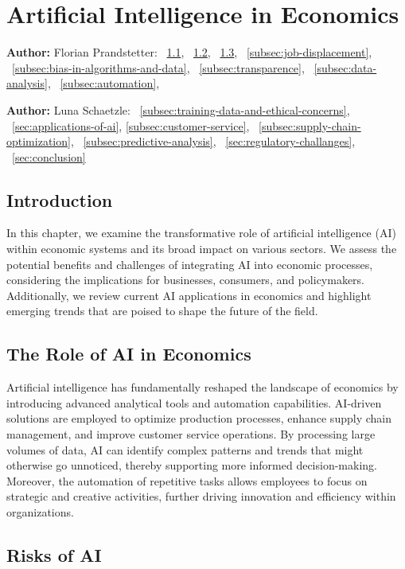 \chapter{Artificial Intelligence in Economics}
\label{chap:Artificial_Intelligence_in_Economics}
\textbf{Author:} Florian Prandstetter: ~\ref{sec:introduction}, ~\ref{sec:role-of-ai-in-economics}, ~\ref{sec:risks-of-ai}, ~\ref{subsec:job-displacement}, ~\ref{subsec:bias-in-algorithms-and-data}, ~\ref{subsec:transparence}, ~\ref{subsec:data-analysis}, ~\ref{subsec:automation}, 

\textbf{Author:} Luna Schaetzle: ~\ref{subsec:training-data-and-ethical-concerns}, ~\ref{sec:applications-of-ai}, \ref{subsec:customer-service}, ~\ref{subsec:supply-chain-optimization}, ~\ref{subsec:predictive-analysis}, ~\ref{sec:regulatory-challanges}, ~\ref{sec:conclusion}


\section{Introduction}
\label{sec:introduction}

In this chapter, we examine the transformative role of artificial intelligence (AI) within economic systems and its broad impact on various sectors. We assess the potential benefits and challenges of integrating AI into economic processes, considering the implications for businesses, consumers, and policymakers. Additionally, we review current AI applications in economics and highlight emerging trends that are poised to shape the future of the field.

\section{The Role of AI in Economics}
\label{sec:role-of-ai-in-economics}

Artificial intelligence has fundamentally reshaped the landscape of economics by introducing advanced analytical tools and automation capabilities. AI-driven solutions are employed to optimize production processes, enhance supply chain management, and improve customer service operations. By processing large volumes of data, AI can identify complex patterns and trends that might otherwise go unnoticed, thereby supporting more informed decision-making. Moreover, the automation of repetitive tasks allows employees to focus on strategic and creative activities, further driving innovation and efficiency within organizations.

\section{Risks of AI}
\label{sec:risks-of-ai}

